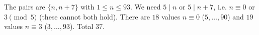 The pairs are $\{n,n+7\}$ with $1\le n\le93$. We need $5\mid n$ or $5\mid n+7$, i.e. $n\equiv0$ or $3\pmod5$ (these cannot both hold). There are $18$ values $n\equiv0$ ($5,\dots,90$) and $19$ values $n\equiv3$ ($3,\dots,93$). Total $\boxed{37}$.
